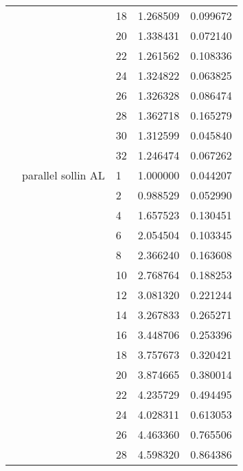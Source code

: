 \begin{tabular}{lllrr}
                      &                     & 18 &  1.268509 &  0.099672 \\
                      &                     & 20 &  1.338431 &  0.072140 \\
                      &                     & 22 &  1.261562 &  0.108336 \\
                      &                     & 24 &  1.324822 &  0.063825 \\
                      &                     & 26 &  1.326328 &  0.086474 \\
                      &                     & 28 &  1.362718 &  0.165279 \\
                      &                     & 30 &  1.312599 &  0.045840 \\
                      &                     & 32 &  1.246474 &  0.067262 \\
                      & parallel sollin AL & 1  &  1.000000 &  0.044207 \\
                      &                     & 2  &  0.988529 &  0.052990 \\
                      &                     & 4  &  1.657523 &  0.130451 \\
                      &                     & 6  &  2.054504 &  0.103345 \\
                      &                     & 8  &  2.366240 &  0.163608 \\
                      &                     & 10 &  2.768764 &  0.188253 \\
                      &                     & 12 &  3.081320 &  0.221244 \\
                      &                     & 14 &  3.267833 &  0.265271 \\
                      &                     & 16 &  3.448706 &  0.253396 \\
                      &                     & 18 &  3.757673 &  0.320421 \\
                      &                     & 20 &  3.874665 &  0.380014 \\
                      &                     & 22 &  4.235729 &  0.494495 \\
                      &                     & 24 &  4.028311 &  0.613053 \\
                      &                     & 26 &  4.463360 &  0.765506 \\
                      &                     & 28 &  4.598320 &  0.864386 \\

\end{tabular}
